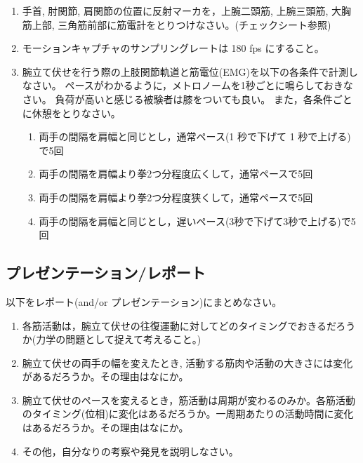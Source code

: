 \documentclass{jsarticle}
\begin{document}
\begin{enumerate}
\item 手首, 肘関節, 肩関節の位置に反射マーカを，上腕二頭筋, 上腕三頭筋, 大胸筋上部, 三角筋前部に筋電計をとりつけなさい。(チェックシート参照)
\item モーションキャプチャのサンプリングレートは 180 fps にすること。
\item 腕立て伏せを行う際の上肢関節軌道と筋電位(EMG)を以下の各条件で計測しなさい。
ペースがわかるように，メトロノームを1秒ごとに鳴らしておきなさい。
負荷が高いと感じる被験者は膝をついても良い。
また，各条件ごとに休憩をとりなさい。
  \begin{enumerate}
    \item 両手の間隔を肩幅と同じとし，通常ペース(1 秒で下げて 1 秒で上げる)で5回
    \item 両手の間隔を肩幅より拳2つ分程度広くして，通常ペースで5回
    \item 両手の間隔を肩幅より拳2つ分程度狭くして，通常ペースで5回
    \item 両手の間隔を肩幅と同じとし，遅いペース(3秒で下げて3秒で上げる)で5回
  \end{enumerate}
\end{enumerate}

\subsection{プレゼンテーション/レポート}

以下をレポート(and/or プレゼンテーション)にまとめなさい。
\begin{enumerate}
  \item 各筋活動は，腕立て伏せの往復運動に対してどのタイミングでおきるだろうか(力学の問題として捉えて考えること。)
  \item 腕立て伏せの両手の幅を変えたとき, 活動する筋肉や活動の大きさには変化があるだろうか。その理由はなにか。
  \item 腕立て伏せのペースを変えるとき，筋活動は周期が変わるのみか。各筋活動のタイミング(位相)に変化はあるだろうか。一周期あたりの活動時間に変化はあるだろうか。その理由はなにか。
  \item その他，自分なりの考察や発見を説明しなさい。
\end{enumerate}
\end{document}
